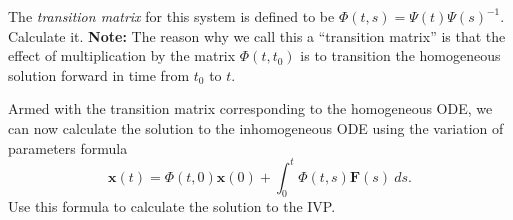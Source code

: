 \documentclass[boxes]{gsypset}
\renewcommand{\bf}[1]{\mathbf{#1}}
\begin{document}
\begin{problem}
\begin{subproblems}
\begin{solution}
			\end{solution}
		\subproblem The \textit{transition matrix} for this system is
			defined to be $\Phi(t,s)=\Psi(t)\Psi(s)^{-1}$. Calculate it.
			\textbf{Note:} The reason why we call this a ``transition
			matrix'' is that the effect of multiplication by the
			matrix $\Phi(t,t_0)$ is to transition the homogeneous
			solution forward in time from $t_0$ to $t$.
			\begin{solution}
				
			\end{solution}
		\subproblem Armed with the transition matrix corresponding to the
			homogeneous ODE, we can now calculate the solution to the
			inhomogeneous ODE using the variation of parameters formula
			\[
				\bf{x}(t)=\Phi(t,0)\bf{x}(0)
				+\int_{0}^{t}\Phi(t,s)\bf{F}(s)~ds.
			\]
			Use this formula to calculate the solution to the IVP.
			\begin{solution}
				
			\end{solution}
	\end{subproblems}
\end{problem}
\end{document}
